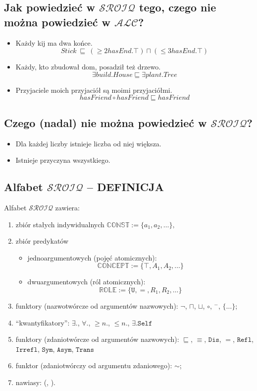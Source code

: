 \documentclass[12pt]{article}
\begin{document}
\subsection{Jak powiedzieć w $\mathcal{SROIQ}$ tego, czego nie można powiedzieć w $\mathcal{ALC}$?}
%
\begin{itemize}
\item Każdy kij ma dwa końce.
$$Stick ~\sqsubseteq~ (\geq 2 hasEnd . \top) \sqcap (\leq 3 hasEnd . \top)$$
%
\item Każdy, kto zbudował dom, posadził też drzewo.
$$\exists build . House \sqsubseteq \exists plant . Tree$$
%
\item Przyjaciele moich przyjaciół są moimi przyjaciółmi.
$$hasFriend \circ hasFriend \sqsubseteq hasFriend$$
\end{itemize}
%

\subsection{Czego (nadal) nie można powiedzieć w $\mathcal{SROIQ}$?}
%
\begin{itemize}
\item Dla każdej liczby istnieje liczba od niej większa.
\item Istnieje przyczyna wszystkiego.
\end{itemize}
%

\subsection{Alfabet $\mathcal{SROIQ}$ -- DEFINICJA}
Alfabet $\mathcal{SROIQ}$ zawiera:
\begin{enumerate}
\item zbiór stałych indywidualnych $\mathbb{CONST} := \{a_{1}, a_{2}, \dots\},$
\item zbiór predykatów 
\begin{itemize}
\item jednoargumentowych (pojęć atomicznych):
$$\mathbb{CONCEPT} := \{\top, A_{1}, A_{2}, \dots\}$$
\item dwuargumentowych (ról atomicznych):
$$\mathbb{ROLE} := \{\texttt{U}, =, R_{1}, R_{2}, \dots\}$$
\end{itemize}
\item funktory (nazwotwórcze od argumentów nazwowych): $\neg$, $\sqcap$, $\sqcup$, $\circ$, $^{-}$, $\{\dots\}$;
\item ``kwantyfikatory'': $\exists .$, $\forall .$, $\geq n . $, $\leq n . $, $\exists . \texttt{Self}$
\item funktory (zdaniotwórcze od argumentów nazwowych): $\sqsubseteq$, $\equiv$, $\texttt{Dis}$, $=$, $\texttt{Refl}$, $\texttt{Irrefl}$, $\texttt{Sym}$, $\texttt{Asym}$, $\texttt{Trans}$
\item funktor (zdaniotwórczy od argumentu zdaniowego): $\sim$;
\item nawiasy: (, ).
\end{enumerate}
%
\end{document}
